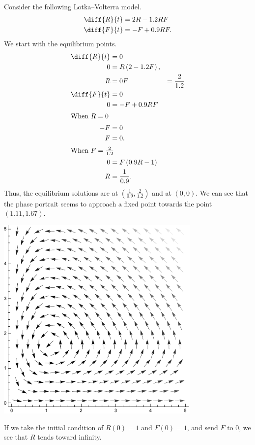 \documentclass[10pt]{mypackage}
\begin{document}
\begin{example}
Consider the following Lotka--Volterra model.
\begin{align*}
  \diff{R}{t} &= 2R - 1.2RF\\
  \diff{F}{t} &= -F + 0.9RF.
\end{align*}
We start with the equilibrium points.
\begin{align*}
  \diff{R}{t} &= 0\\
  0 &= R\left(2 - 1.2F\right),\\
  R &= 0
  F &= \frac{2}{1.2}\\
  \diff{F}{t} &= 0\\
  0 &= -F + 0.9RF\\
  \intertext{When $R = 0$}
  -F &= 0\\
  F &= 0.\\
  \intertext{When $F = \frac{2}{1.2}$}
  0 &= F\left(0.9R - 1\right)\\
  R &= \frac{1}{0.9}.
\end{align*}
Thus, the equilibrium solutions are at $\left(\frac{1}{0.9},\frac{2}{1.2}\right)$ and at $\left(0,0\right)$. We can see that the phase portrait seems to approach a fixed point towards the point $\left(1.11,1.67\right)$.
\begin{center}
  \includegraphics[width=10cm]{images/lv_eqns_1.pdf}
\end{center}
If we take the initial condition of $R(0) = 1$ and $F(0) = 1$, and send $F$ to $0$, we see that $R$ tends toward infinity.\newline


\end{example}
\end{document}
